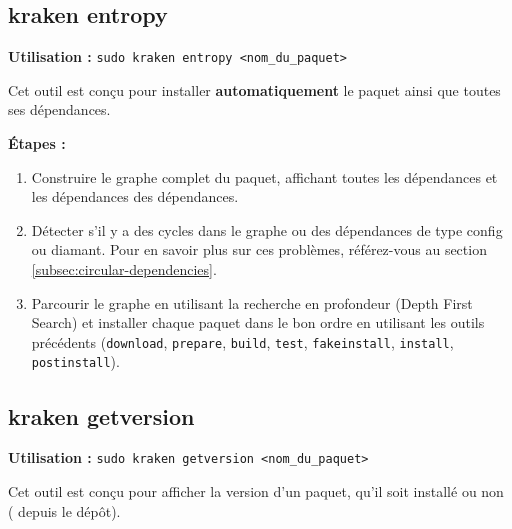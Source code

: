 
\subsection{kraken entropy}

\textbf{Utilisation :} \texttt{sudo kraken entropy <nom\_du\_paquet>}

Cet outil est conçu pour installer \textbf{automatiquement} le paquet ainsi que toutes ses dépendances.

\textbf{Étapes :}
\begin{enumerate}
  \item Construire le graphe complet du paquet, affichant toutes les dépendances et les dépendances des dépendances.
  \item Détecter s'il y a des cycles dans le graphe ou des dépendances de type config ou diamant. Pour en savoir plus sur ces problèmes, référez-vous au section \textcolor{blue}{\ref{subsec:circular-dependencies}}.
  \item Parcourir le graphe en utilisant la recherche en profondeur (Depth First Search) et installer chaque paquet dans le bon ordre en utilisant les outils précédents (\texttt{download}, \texttt{prepare}, \texttt{build}, \texttt{test}, \texttt{fakeinstall}, \texttt{install}, \texttt{postinstall}).
\end{enumerate}




\subsection{kraken getversion}

\textbf{Utilisation :} \texttt{sudo kraken getversion <nom\_du\_paquet>}

Cet outil est conçu pour afficher la version d'un paquet, qu'il soit installé ou non ( depuis le dépôt).


